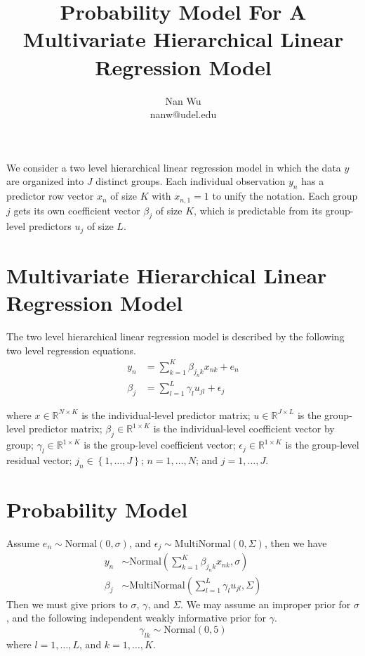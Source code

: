 \documentclass[12pt]{article}
\def\eqsuma{\sum \limits_{k=1}^K \beta_{j_nk} x_{nk}}
\def\eqsumb{\sum \limits_{l=1}^L \gamma_l u_{jl}}
\begin{document}
\title{Probability Model For A Multivariate Hierarchical Linear Regression Model}
\author{Nan Wu \\ nanw@udel.edu}
\date{}
\maketitle

We consider a two level hierarchical linear regression model in which the data $y$ are organized into $J$ distinct groups. Each individual observation $y_n$ has a predictor row vector $x_n$ of size $K$ with $x_{n,1}=1$ to unify the notation. Each group $j$ gets its own coefficient vector $\beta_j$ of size $K$, which is predictable from its group-level predictors $u_j$ of size $L$.

\section{Multivariate Hierarchical Linear Regression Model}

The two level hierarchical linear regression model is described by the following two level regression equations.
\begin{align}
  y_n &= \eqsuma + e_n \\
  \beta_j &= \eqsumb + \epsilon_j
\end{align}

where $x \in \mathbb{R}^{N \times K} $ is the individual-level predictor matrix; $u \in \mathbb{R}^{J \times L}$ is the group-level predictor matrix; $\beta_j \in \mathbb{R}^{1 \times K}$ is the individual-level coefficient vector by group; $\gamma_l \in \mathbb{R}^{1 \times K}$ is the group-level coefficient vector; $\epsilon_j \in \mathbb{R}^{1 \times K}$ is the group-level residual vector; $j_n \in \left\{1,\ldots,J \right\}$; $n=1,\ldots,N$; and $j=1,\ldots,J$.

\section{Probability Model}

Assume $e_n \sim \mathrm{Normal}(0, \sigma)$, and $\epsilon_j \sim \mathrm{MultiNormal}(0, \Sigma)$, then we have
\begin{align}
  y_n &\sim \mathrm{Normal}\left(\eqsuma,\sigma \right) \\
  \beta_j &\sim \mathrm{MultiNormal}\left(\eqsumb, \Sigma \right)
\end{align}
Then we must give priors to $\sigma$, $\gamma$, and $\Sigma$.
We may assume an improper prior for $\sigma$, and the following independent weakly informative prior for $\gamma$.
\begin{equation*}
  \gamma_{lk} \sim \mathrm{Normal} \left(0, 5 \right)
\end{equation*}
where $l=1,\ldots, L$, and $k=1,\ldots,K$.
\end{document}
